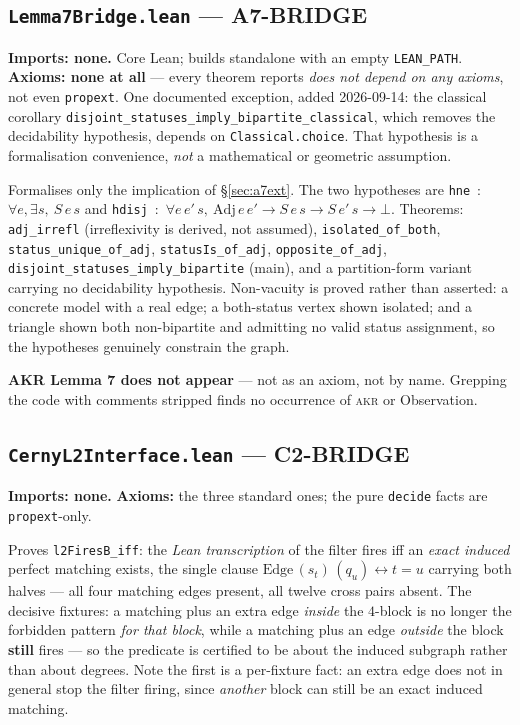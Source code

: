 \documentclass[11pt,a4paper]{article}
\theoremstyle{plain}
\theoremstyle{definition}
\theoremstyle{remark}
\begin{document}
\subsection*{\texttt{Lemma7Bridge.lean} --- \textsf{A7-BRIDGE}}
\textbf{Imports: none.} Core Lean; builds standalone with an empty
\texttt{LEAN\_PATH}. \textbf{Axioms: none at all} --- every theorem reports
\emph{does not depend on any axioms}, not even \texttt{propext}. One documented
exception, added 2026-09-14: the classical corollary
\texttt{disjoint\_statuses\_imply\_bipartite\_classical}, which removes the
decidability hypothesis, depends on \texttt{Classical.choice}. That hypothesis is
a formalisation convenience, \emph{not} a mathematical or geometric assumption.

Formalises only the implication of \S\ref{sec:a7ext}. The two hypotheses are
\texttt{hne}~:~$\forall e,\exists s,\ S\,e\,s$ and
\texttt{hdisj}~:~$\forall e\,e'\,s,\ \mathrm{Adj}\,e\,e'\to S\,e\,s\to S\,e'\,s\to\bot$.
Theorems: \texttt{adj\_irrefl} (irreflexivity is derived, not assumed),
\texttt{isolated\_of\_both}, \texttt{status\_unique\_of\_adj},
\texttt{statusIs\_of\_adj}, \texttt{opposite\_of\_adj},
\texttt{disjoint\_statuses\_imply\_bipartite} (main), and a partition-form
variant carrying no decidability hypothesis. Non-vacuity is proved rather than
asserted: a concrete model with a real edge; a both-status vertex shown isolated;
and a triangle shown both non-bipartite and admitting no valid status assignment,
so the hypotheses genuinely constrain the graph.

\textbf{AKR Lemma 7 does not appear} --- not as an axiom, not by name. Grepping
the code with comments stripped finds no occurrence of \textsc{akr} or
Observation.

\subsection*{\texttt{CernyL2Interface.lean} --- \textsf{C2-BRIDGE}}
\textbf{Imports: none.} \textbf{Axioms:} the three standard ones; the pure
\texttt{decide} facts are \texttt{propext}-only.

Proves \texttt{l2FiresB\_iff}: the \emph{Lean transcription} of the filter fires iff an \emph{exact
induced} perfect matching exists, the single clause
$\mathrm{Edge}\,(s_t)\,(q_u)\leftrightarrow t=u$ carrying both halves --- all four
matching edges present, all twelve cross pairs absent. The decisive fixtures:
a matching plus an extra edge \emph{inside} the $4$-block is no longer the
forbidden pattern \emph{for that block}, while a matching plus an edge
\emph{outside} the block \textbf{still} fires --- so the predicate is certified to
be about the induced subgraph rather than about degrees. Note the first is a
per-fixture fact: an extra edge does not in general stop the filter firing, since
\emph{another} block can still be an exact induced matching.
\end{document}
